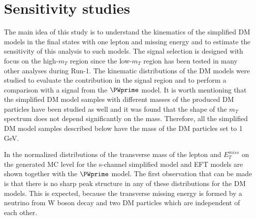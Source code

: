 


















\section{Sensitivity studies}

The main idea of this study is to understand the kinematics of the simplified DM models in the final states with one lepton and missing energy and to estimate the sensitivity of this analysis to such models.
The signal selection is designed with focus on the high-$m_{T}$ region 
since the low-$m_T$ region has been tested in many other analyses during Run-1.
The kinematic distributions of the DM models were studied to evaluate the contribution in the signal region and to perform a comparison with a signal from the $\PWprime$ model.
It is worth mentioning that the simplified DM model samples with different masses of the produced DM particles have been studied as well and it was found that the shape of the $m_T$ spectrum does not depend significantly on the mass. Therefore, all the simplified DM model samples described below have the mass of the DM particles set to 1 GeV.

In  the normalized distributions of the transverse mass of the lepton and $E_{T}^{miss}$ on the generated MC level
for the s-channel simplified model and EFT models are shown together with the $\PWprime$ model.
The first observation that can be made is that there is no sharp peak structure in any of these distributions for the DM models.
This is expected, because the transverse missing energy is formed by
a neutrino from W boson decay and two DM particles which are independent of each other. 

